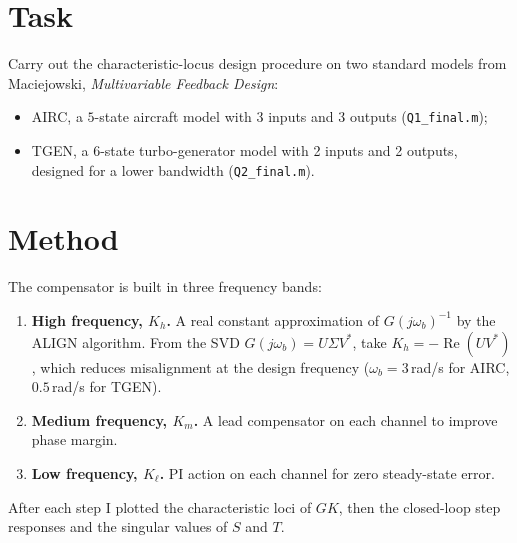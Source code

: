 


\section*{Task}
Carry out the characteristic-locus design procedure on two standard models from Maciejowski, \emph{Multivariable Feedback Design}:
\begin{itemize}
  \item AIRC, a $5$-state aircraft model with 3 inputs and 3 outputs (\texttt{Q1\_final.m});
  \item TGEN, a $6$-state turbo-generator model with 2 inputs and 2 outputs, designed for a lower bandwidth (\texttt{Q2\_final.m}).
\end{itemize}

\section*{Method}
The compensator is built in three frequency bands:
\begin{enumerate}
  \item \textbf{High frequency, $K_h$.} A real constant approximation of $G(j\omega_b)^{-1}$ by the ALIGN algorithm. From the SVD $G(j\omega_b)=U\Sigma V^*$, take $K_h=-\operatorname{Re}(UV^*)$, which reduces misalignment at the design frequency ($\omega_b=3$\,rad/s for AIRC, $0.5$\,rad/s for TGEN).
  \item \textbf{Medium frequency, $K_m$.} A lead compensator on each channel to improve phase margin.
  \item \textbf{Low frequency, $K_\ell$.} PI action on each channel for zero steady-state error.
\end{enumerate}
After each step I plotted the characteristic loci of $GK$, then the closed-loop step responses and the singular values of $S$ and $T$.


